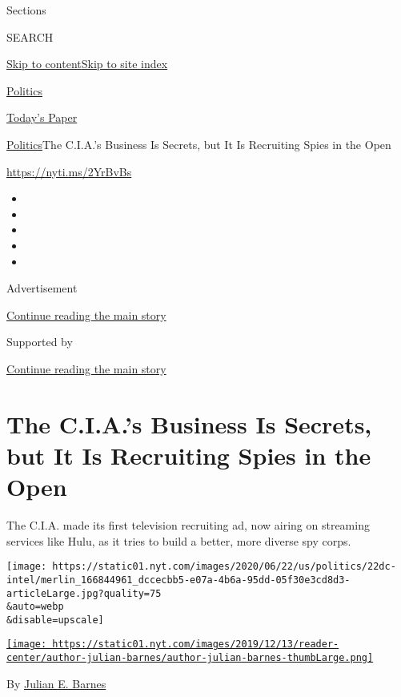 Sections

SEARCH

\protect\hyperlink{site-content}{Skip to
content}\protect\hyperlink{site-index}{Skip to site index}

\href{https://www.nytimes.com/section/politics}{Politics}

\href{https://myaccount.nytimes.com/auth/login?response_type=cookie\&client_id=vi}{}

\href{https://www.nytimes.com/section/todayspaper}{Today's Paper}

\href{/section/politics}{Politics}\textbar{}The C.I.A.'s Business Is
Secrets, but It Is Recruiting Spies in the Open

\url{https://nyti.ms/2YrBvBs}

\begin{itemize}
\item
\item
\item
\item
\item
\end{itemize}

Advertisement

\protect\hyperlink{after-top}{Continue reading the main story}

Supported by

\protect\hyperlink{after-sponsor}{Continue reading the main story}

\hypertarget{the-cias-business-is-secrets-but-it-is-recruiting-spies-in-the-open}{%
\section{The C.I.A.'s Business Is Secrets, but It Is Recruiting Spies in
the
Open}\label{the-cias-business-is-secrets-but-it-is-recruiting-spies-in-the-open}}

The C.I.A. made its first television recruiting ad, now airing on
streaming services like Hulu, as it tries to build a better, more
diverse spy corps.

\texttt{[image: https://static01.nyt.com/images/2020/06/22/us/politics/22dc-intel/merlin\_166844961\_dccecbb5-e07a-4b6a-95dd-05f30e3cd8d3-articleLarge.jpg?quality=75\\\&auto=webp\\\&disable=upscale]}

\href{https://www.nytimes.com/by/julian-e-barnes}{\texttt{[image: https://static01.nyt.com/images/2019/12/13/reader-center/author-julian-barnes/author-julian-barnes-thumbLarge.png]}}

By \href{https://www.nytimes.com/by/julian-e-barnes}{Julian E. Barnes}

